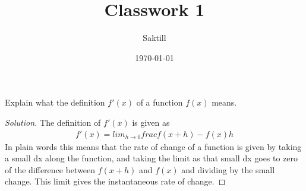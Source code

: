 \documentclass[aps,pra,notitlepage,amsmath,amssymb,letterpaper,12pt]{revtex4-1}
\newenvironment{problem}[2][Problem]{\begin{trivlist}
\item[\hskip \labelsep {\bfseries #1}\hskip \labelsep {\bfseries #2.}]}{\end{trivlist}}
\newenvironment{solution}{\begin{proof}[Solution]}{\end{proof}}
\begin{document}
 
\title{Classwork 1}
\author{Saktill}
\date{\today}

\maketitle

%
\begin{problem}{x.yz} 
Explain what the definition $f'(x)$ of a function $f(x)$ means.
\end{problem}
 
\begin{solution}
The definition of $f'(x)$ is given as
\[
\begin{split}
f'(x) =  lim_{h\to 0} frac{f(x+h) - f(x)}{h}
\end{split}
\]
In plain words this means that the rate of change of a function is given by taking a small dx along the function, and taking the limit as that small dx goes to zero of the difference between $f(x+h)$ and $f(x)$ and dividing by the small change. This limit gives the instantaneous rate of change.




\end{solution}
\end{document}
